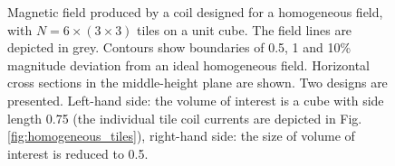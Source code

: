 \begin{figure}
  \centering
  \quad
  \caption{Magnetic field produced by a coil designed for a homogeneous field, with $N = 6 \times (3 \times 3)$ tiles on a unit cube. The field lines are depicted in grey. Contours show boundaries of 0.5, 1 and 10\% magnitude deviation from an ideal homogeneous field. Horizontal cross sections in the middle-height plane are shown. Two designs are presented. Left-hand side: the volume of interest is a cube with side length 0.75 (the individual tile coil currents are depicted in Fig.\,\ref{fig:homogeneous_tiles}), right-hand side: the size of volume of interest is reduced to 0.5.}
    \label{fig:homogeneous_performance}
\end{figure}


